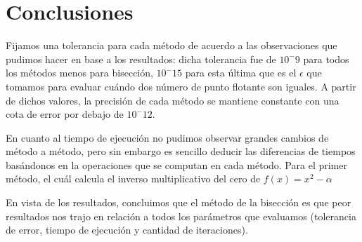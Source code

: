 \section{Conclusiones}

Fijamos una tolerancia para cada método de acuerdo a las observaciones que pudimos hacer en base a los resultados: dicha tolerancia fue de ${10^-9}$ para
todos los métodos menos para bisección, ${10^-15}$ para esta última que es el $\epsilon$ que tomamos para evaluar cuándo dos número de punto flotante son iguales. A partir de dichos valores, la precisión de cada método se mantiene constante con una cota de error por debajo de ${10^-12}$.

En cuanto al tiempo de ejecución no pudimos observar grandes cambios de método a método, pero sin embargo es sencillo deducir las diferencias de tiempos basándonos en la operaciones que se computan en cada método. Para el primer método, el cuál calcula el inverso multiplicativo del cero de $f(x) = x^2 - \alpha$




En vista de los resultados, concluimos que el método de la bisección es que peor resultados nos trajo en relación a todos los parámetros que evaluamos (tolerancia de error, tiempo de ejecución y cantidad de iteraciones).